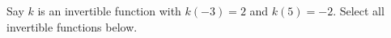 \documentclass{ximera}
\author{Kenneth Berglund}
\begin{document}
\begin{exercise}
Say $k$ is an invertible function with $k(-3) = 2$ and $k(5) = -2$. Select all invertible functions below.
\begin{selectAll}





\end{selectAll}
\end{exercise}
\end{document}

